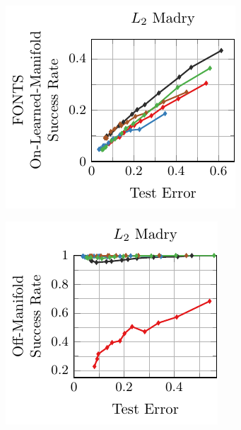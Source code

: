 \begin{appendix}
\begin{figure}[t]
    \centering
    \vskip -0.4cm
    \begin{subfigure}{0.255\textwidth}
        \centering
        \includegraphics[width=\textwidth]{appendix_l2_fonts_error_on_learned_madry.pdf}
    \end{subfigure}
    \begin{subfigure}{0.235\textwidth}
        \centering
        \includegraphics[width=\textwidth]{appendix_l2_fonts_error_off_madry.pdf}

\end{subfigure}
\end{figure}
\end{appendix}
